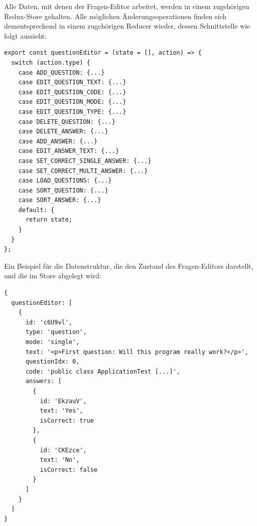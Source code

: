 Alle Daten, mit denen der Fragen-Editor arbeitet, werden in einem zugehörigen Redux-Store gehalten. Alle möglichen Änderungsoperationen finden sich dementsprechend in einem zugehörigen Reducer wieder, dessen Schnittstelle wie folgt aussieht:


\begin{minipage}{\linewidth}
\begin{lstlisting}[caption={Auszug aus dem Reducer für den Fragen-Editor (aus: src/server/reducers/questions.js)}]
export const questionEditor = (state = [], action) => {
  switch (action.type) {
    case ADD_QUESTION: {...}
    case EDIT_QUESTION_TEXT: {...}
    case EDIT_QUESTION_CODE: {...}
    case EDIT_QUESTION_MODE: {...}
    case EDIT_QUESTION_TYPE: {...}
    case DELETE_QUESTION: {...}
    case DELETE_ANSWER: {...}
    case ADD_ANSWER: {...}
    case EDIT_ANSWER_TEXT: {...}
    case SET_CORRECT_SINGLE_ANSWER: {...}
    case SET_CORRECT_MULTI_ANSWER: {...}
    case LOAD_QUESTIONS: {...}
    case SORT_QUESTION: {...}
    case SORT_ANSWER: {...}
    default: {
      return state;
    }
  }
};
\end{lstlisting}
\end{minipage}


Ein Beispiel für die Datenstruktur, die den Zustand des Fragen-Editors darstellt, und die im Store abgelegt wird:

\begin{minipage}{\linewidth}
\begin{lstlisting}[caption={Zustand des Fragen-Editors innerhalb des Redux-Store mit einer einzigen Frage.}]
{
  questionEditor: [
    {
      id: 'c6U9vl',
      type: 'question',
      mode: 'single',
      text: '<p>First question: Will this program really work?</p>',
      questionIdx: 0,
      code: 'public class ApplicationTest [...]',
      answers: [
        {
          id: 'EkzauV',
          text: 'Yes',
          isCorrect: true
        },
        {
          id: 'CKEzce',
          text: 'No',
          isCorrect: false
        }
      ]
    }
  ]
}
\end{lstlisting}
\end{minipage}
